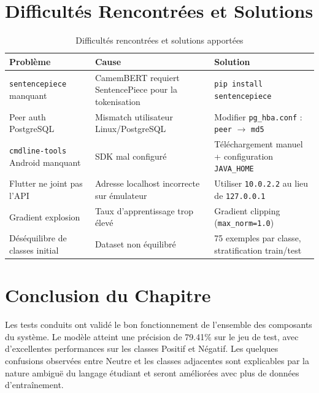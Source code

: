 \section{Difficultés Rencontrées et Solutions}

\begin{table}[H]
\centering
\caption{Difficultés rencontrées et solutions apportées}
\label{tab:difficulties}
\renewcommand{\arraystretch}{1.5}
\begin{tabular}{p{4cm} p{5cm} p{4cm}}
\toprule
\rowcolor{bleuprincipal!15}
\textbf{Problème} & \textbf{Cause} & \textbf{Solution} \\
\midrule
\texttt{sentencepiece} manquant & CamemBERT requiert SentencePiece pour la tokenisation & \texttt{pip install sentencepiece} \\
\rowcolor{gray!8}
Peer auth PostgreSQL & Mismatch utilisateur Linux/PostgreSQL & Modifier \texttt{pg\_hba.conf} : \texttt{peer} $\rightarrow$ \texttt{md5} \\
\texttt{cmdline-tools} Android manquant & SDK mal configuré & Téléchargement manuel + configuration \texttt{JAVA\_HOME} \\
\rowcolor{gray!8}
Flutter ne joint pas l'API & Adresse localhost incorrecte sur émulateur & Utiliser \texttt{10.0.2.2} au lieu de \texttt{127.0.0.1} \\
Gradient explosion & Taux d'apprentissage trop élevé & Gradient clipping (\texttt{max\_norm=1.0}) \\
\rowcolor{gray!8}
Déséquilibre de classes initial & Dataset non équilibré & 75 exemples par classe, stratification train/test \\
\bottomrule
\end{tabular}
\end{table}

\section*{Conclusion du Chapitre}

Les tests conduits ont validé le bon fonctionnement de l'ensemble des
composants du système. Le modèle atteint une précision de 79.41\% sur le
jeu de test, avec d'excellentes performances sur les classes Positif et
Négatif. Les quelques confusions observées entre Neutre et les classes
adjacentes sont explicables par la nature ambiguë du langage étudiant et
seront améliorées avec plus de données d'entraînement.

\cleardoublepage
